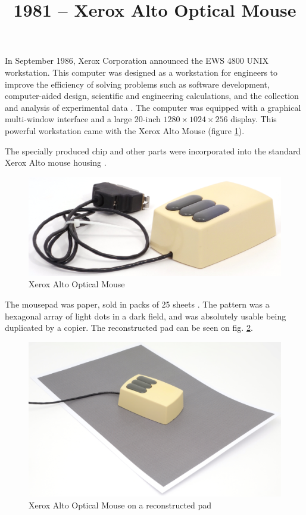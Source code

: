 \documentclass[11pt, a4paper]{article}
\begin{document}
\title{1981 -- Xerox Alto Optical Mouse}
\date{}
\maketitle
{}
In September 1986, Xerox Corporation announced the EWS 4800 UNIX workstation. This computer was designed as a workstation for engineers to improve the efficiency of solving problems such as software development, computer-aided design, scientific and engineering calculations, and the collection and analysis of experimental data \cite{yt}. The computer was equipped with a graphical multi-window interface and a large 20-inch $1280 \times 1024 \times 256$ display. This powerful workstation came with the Xerox Alto Mouse (figure \ref{fig:XeroxAltoPic}).

The specially produced chip and other parts were incorporated into the standard Xerox Alto mouse housing \cite{vlsi82}.

\begin{figure}[h]
    \centering
    \includegraphics[scale=0.7]{1981_xerox_alto_mouse/pic_30.jpg}
    \caption{Xerox Alto Optical Mouse}
    \label{fig:XeroxAltoPic}
\end{figure}

The mousepad was paper, sold in packs of 25 sheets \cite{pad}. The pattern was a
hexagonal array of light dots in a dark field, and was absolutely usable being duplicated by a copier. The reconstructed pad can be seen on fig. \ref{fig:XeroxAltoPad}.

\begin{figure}[h]
    \centering
    \includegraphics[scale=0.4]{1981_xerox_alto_mouse/pad_30.jpg}
    \caption{Xerox Alto Optical Mouse on a reconstructed pad}
    \label{fig:XeroxAltoPad}
\end{figure}
\end{document}
